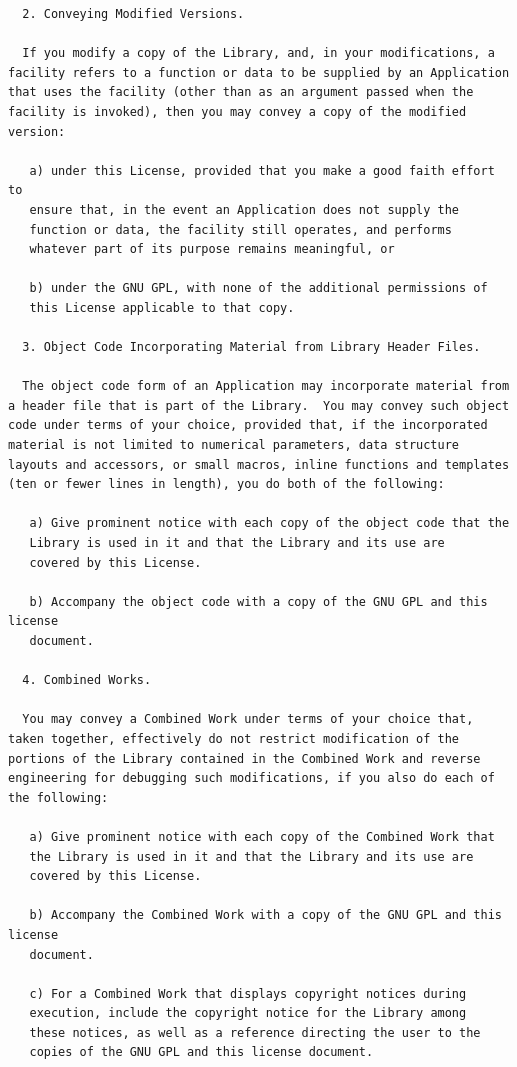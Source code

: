 \documentclass[10pt, headsepline,DIV14,BCOR0.5cm]{scrreprt}
\begin{document}
\begin{lstlisting}
  2. Conveying Modified Versions.

  If you modify a copy of the Library, and, in your modifications, a
facility refers to a function or data to be supplied by an Application
that uses the facility (other than as an argument passed when the
facility is invoked), then you may convey a copy of the modified
version:

   a) under this License, provided that you make a good faith effort to
   ensure that, in the event an Application does not supply the
   function or data, the facility still operates, and performs
   whatever part of its purpose remains meaningful, or

   b) under the GNU GPL, with none of the additional permissions of
   this License applicable to that copy.

  3. Object Code Incorporating Material from Library Header Files.

  The object code form of an Application may incorporate material from
a header file that is part of the Library.  You may convey such object
code under terms of your choice, provided that, if the incorporated
material is not limited to numerical parameters, data structure
layouts and accessors, or small macros, inline functions and templates
(ten or fewer lines in length), you do both of the following:

   a) Give prominent notice with each copy of the object code that the
   Library is used in it and that the Library and its use are
   covered by this License.

   b) Accompany the object code with a copy of the GNU GPL and this license
   document.

  4. Combined Works.

  You may convey a Combined Work under terms of your choice that,
taken together, effectively do not restrict modification of the
portions of the Library contained in the Combined Work and reverse
engineering for debugging such modifications, if you also do each of
the following:

   a) Give prominent notice with each copy of the Combined Work that
   the Library is used in it and that the Library and its use are
   covered by this License.

   b) Accompany the Combined Work with a copy of the GNU GPL and this license
   document.

   c) For a Combined Work that displays copyright notices during
   execution, include the copyright notice for the Library among
   these notices, as well as a reference directing the user to the
   copies of the GNU GPL and this license document.


\end{lstlisting}
\end{document}
